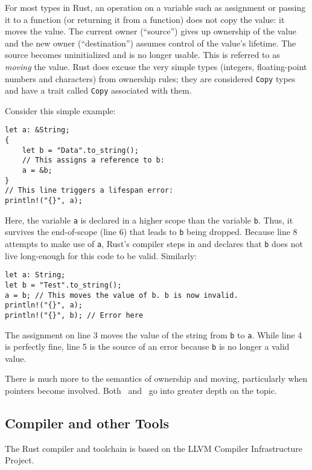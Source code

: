 For most types in Rust, an operation on a variable such as assignment or passing it to a function (or returning it from a function) does not copy the value: it moves the value. The current owner (``source'') gives up ownership of the value and the new owner (``destination'') assumes control of the value's lifetime. The source becomes uninitialized and is no longer usable. This is referred to as \textit{moving} the value. Rust does excuse the very simple types (integers, floating-point numbers and characters) from ownership rules; they are considered \texttt{Copy} types and have a trait called \texttt{Copy} associated with them.

Consider this simple example:

\begin{lstlisting}
let a: &String;
{
    let b = "Data".to_string();
    // This assigns a reference to b:
    a = &b;
}
// This line triggers a lifespan error:
println!("{}", a);
\end{lstlisting}

Here, the variable \texttt{a} is declared in a higher scope than the variable \texttt{b}. Thus, it survives the end-of-scope (line 6) that leads to \texttt{b} being dropped. Because line 8 attempts to make use of \texttt{a}, Rust's compiler steps in and declares that \texttt{b} does not live long-enough for this code to be valid. Similarly:

\begin{lstlisting}
let a: String;
let b = "Test".to_string();
a = b; // This moves the value of b. b is now invalid.
println!("{}", a);
println!("{}", b); // Error here
\end{lstlisting}

The assignment on line 3 moves the value of the string from \texttt{b} to \texttt{a}. While line 4 is perfectly fine, line 5 is the source of an error because \texttt{b} is no longer a valid value.

There is much more to the semantics of ownership and moving, particularly when pointers become involved. Both~\cite{rpl.2019} and~\cite{programming.rust.2021} go into greater depth on the topic.

\subsection{Compiler and other Tools}

The Rust compiler and toolchain is based on the LLVM Compiler Infrastructure Project.